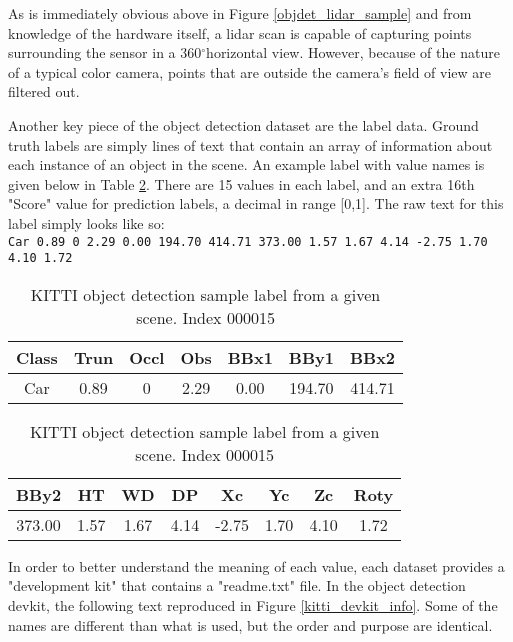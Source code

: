 \def \DEG{$^{\circ}$} %

As is immediately obvious above in Figure \ref{objdet_lidar_sample} and from knowledge of the hardware itself, a lidar scan is capable of capturing points surrounding the sensor in a 360\DEG horizontal view. However, because of the nature of a typical color camera, points that are outside the camera's field of view are filtered out. 

Another key piece of the object detection dataset are the label data. Ground truth labels are simply lines of text that contain an array of information about each instance of an object in the scene. An example label with value names is given below in Table \ref{kitti_label_sample}. There are 15 values in each label, and an extra 16th "Score" value for prediction labels, a decimal in range [0,1]. The raw text for this label simply looks like so: \\
\texttt{Car 0.89 0 2.29 0.00 194.70 414.71 373.00 1.57 1.67 4.14 -2.75 1.70 4.10 1.72} \\


\begin{table}[h]
\centering
\caption{KITTI object detection sample label from a given scene. Index 000015}
\begin{tabular}{|c|c|c|c|c|c|c|}
\hline
Class & Trun & Occl & Obs  & BBx1  & BBy1   & BBx2  \\
\hline
Car   & 0.89       & 0         & 2.29 & 0.00  & 194.70 & 414.71 \\
\hline
\end{tabular}
\begin{tabular}{|c|c|c|c|c|c|c|c|}
\hline
BBy2   & HT   & WD   & DP   & Xc    & Yc   & Zc   & Roty \\
\hline
373.00 & 1.57 & 1.67 & 4.14 & -2.75 & 1.70 & 4.10 & 1.72 \\
\hline
\end{tabular}
\label{kitti_label_sample}
\end{table}

In order to better understand the meaning of each value, each dataset provides a "development kit" that contains a "readme.txt" file. In the object detection devkit, the following text reproduced in Figure \ref{kitti_devkit_info}. Some of the names are different than what is used, but the order and purpose are identical. 

